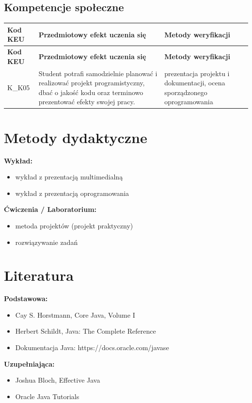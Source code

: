 \documentclass[12pt, a4paper]{article}
\newcommand{\thdrule}{\noalign{\global\setlength{\extrarowheight}{0pt}}}
\newcommand{\thdend}{\noalign{\global\setlength{\extrarowheight}{3pt}}}
\begin{document}
\subsection*{Kompetencje społeczne}
{\scriptsize
\begin{longtable}{m{1.6cm}m{9.0cm}m{4.2cm}}
\thdrule\toprule
\rowcolor{pjatkRed} {\color{white}\footnotesize\textbf{\vphantom{Ag}Kod KEU}} & {\color{white}\footnotesize\textbf{\vphantom{Ag}Przedmiotowy efekt uczenia się}} & {\color{white}\footnotesize\textbf{\vphantom{Ag}Metody weryfikacji}} \\
\midrule\thdend
\endfirsthead
\thdrule\toprule
\rowcolor{pjatkRed} {\color{white}\footnotesize\textbf{\vphantom{Ag}Kod KEU}} & {\color{white}\footnotesize\textbf{\vphantom{Ag}Przedmiotowy efekt uczenia się}} & {\color{white}\footnotesize\textbf{\vphantom{Ag}Metody weryfikacji}} \\
\midrule\thdend
\endhead
  \rowcolor{tableRowLight} K\_K05 & Student potrafi samodzielnie planować i realizować projekt programistyczny, dbać o jakość kodu oraz terminowo prezentować efekty swojej pracy. & prezentacja projektu i dokumentacji, ocena sporządzonego oprogramowania \\
\bottomrule
\end{longtable}}

\section{Metody dydaktyczne}

\textbf{Wykład:}
\begin{itemize}
  \item wykład z prezentacją multimedialną
  \item wykład z prezentacją oprogramowania
\end{itemize}
\vspace{4pt}
\textbf{Ćwiczenia / Laboratorium:}
\begin{itemize}
  \item metoda projektów (projekt praktyczny)
  \item rozwiązywanie zadań
\end{itemize}
\vspace{4pt}


\section{Literatura}

\textbf{Podstawowa:}
\begin{itemize}
  \item Cay S. Horstmann, Core Java, Volume I
  \item Herbert Schildt, Java: The Complete Reference
  \item Dokumentacja Java: https://docs.oracle.com/javase
\end{itemize}

\textbf{Uzupełniająca:}
\begin{itemize}
  \item Joshua Bloch, Effective Java
  \item Oracle Java Tutorials
\end{itemize}
\end{document}
